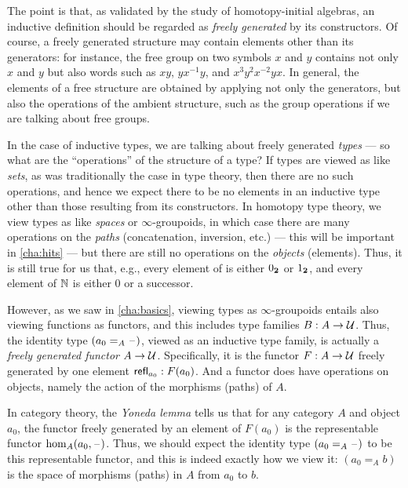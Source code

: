 %
%
The point is that, as validated by the study of homotopy-initial algebras, an inductive definition should be regarded as \emph{freely generated} by its constructors.
Of course, a freely generated structure may contain elements other than its generators: for instance, the free group on two symbols $x$ and $y$ contains not only $x$ and $y$ but also words such as $xy$, $yx^{-1}y$, and $x^3y^2x^{-2}yx$.
In general, the elements of a free structure are obtained by applying not only the generators, but also the operations of the ambient structure, such as the group operations if we are talking about free groups.

In the case of inductive types, we are talking about freely generated \emph{types} --- so what are the ``operations'' of the structure of a type?
If types are viewed as like \emph{sets}, as was traditionally the case in type theory, then there are no such operations, and hence we expect there to be no elements in an inductive type other than those resulting from its constructors.
In homotopy type theory, we view types as like \emph{spaces} or $\infty$-groupoids,%
in which case there are many operations on the \emph{paths} (concatenation, inversion, etc.) --- this will be important in \cref{cha:hits} --- but there are still no operations on the \emph{objects} (elements).
Thus, it is still true for us that, e.g., every element of \bool is either ${0_{\mathbf{2}}}$ or ${1_{\mathbf{2}}}$, and every element of $\mathbb{N}$ is either $0$ or a successor.

However, as we saw in \cref{cha:basics}, viewing types as $\infty$-groupoids entails also viewing functions as functors, and this includes type families $B:A\to\mathcal{U}$.
Thus, the identity type $(a_0 =_A \mathord{\hspace{1pt}\text{--}\hspace{1pt}})$, viewed as an inductive type family, is actually a \emph{freely generated functor} $A\to\mathcal{U}$.
Specifically, it is the functor $F:A\to\mathcal{U}$ freely generated by one element $\mathsf{refl}_{a_0}: F(a_0)$.
And a functor does have operations on objects, namely the action of the morphisms (paths) of $A$.

In category theory, the \emph{Yoneda lemma} tells us that for any category $A$ and object $a_0$, the functor freely generated by an element of $F(a_0)$ is the representable functor $\hom_A(a_0,\mathord{\hspace{1pt}\text{--}\hspace{1pt}})$.
Thus, we should expect the identity type $(a_0 =_A \mathord{\hspace{1pt}\text{--}\hspace{1pt}})$ to be this representable functor, and this is indeed exactly how we view it: $(a_0 =_A b)$ is the space of morphisms (paths) in $A$ from $a_0$ to $b$.

